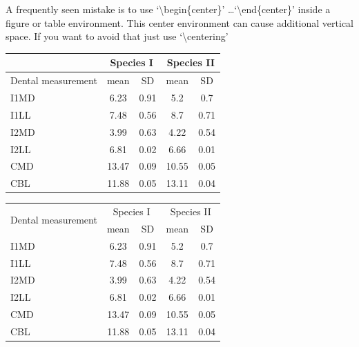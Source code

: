 A frequently seen mistake is to use `\textbackslash begin\{center\}' \dots `\textbackslash end\{center\}' inside a figure or table environment. This center environment can cause additional vertical space. If you want to avoid that just use `\textbackslash centering'


\begin{table}
\centering
\label{table:bad_table}
\begin{tabular}{|l|c|c|c|c|}
\hline 
& \multicolumn{2}{c}{Species I} & \multicolumn{2}{c|}{Species II} \\ 
\hline
Dental measurement  & mean & SD  & mean & SD  \\ \hline 
\hline
I1MD & 6.23 & 0.91 & 5.2  & 0.7  \\
\hline 
I1LL & 7.48 & 0.56 & 8.7  & 0.71 \\
\hline 
I2MD & 3.99 & 0.63 & 4.22 & 0.54 \\
\hline 
I2LL & 6.81 & 0.02 & 6.66 & 0.01 \\
\hline 
CMD & 13.47 & 0.09 & 10.55 & 0.05 \\
\hline 
CBL & 11.88 & 0.05 & 13.11 & 0.04\\ 
\hline 
\end{tabular}
\end{table}

\begin{table}
\centering
\label{table:nice_table}
\begin{tabular}{l c c c c}
\hline 
\multirow{2}{*}{Dental measurement} & \multicolumn{2}{c}{Species I} & \multicolumn{2}{c}{Species II} \\ 
\cline{2-5}
  & mean & SD  & mean & SD  \\ 
\hline
I1MD & 6.23 & 0.91 & 5.2  & 0.7  \\

I1LL & 7.48 & 0.56 & 8.7  & 0.71 \\

I2MD & 3.99 & 0.63 & 4.22 & 0.54 \\

I2LL & 6.81 & 0.02 & 6.66 & 0.01 \\

CMD & 13.47 & 0.09 & 10.55 & 0.05 \\

CBL & 11.88 & 0.05 & 13.11 & 0.04\\ 
\hline 
\end{tabular}
\end{table}


